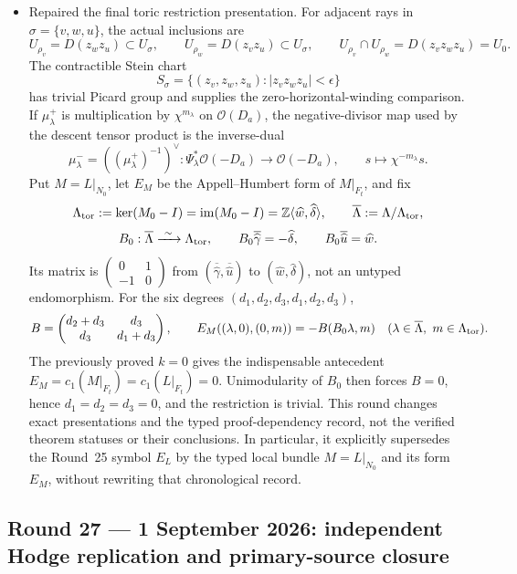 \begin{itemize}[leftmargin=1.8em]
\item Repaired the final toric restriction presentation.  For adjacent rays
in \(\sigma=\{v,w,u\}\), the actual inclusions are
\[
 U_{\rho_v}=D(z_wz_u)\subset U_\sigma,\qquad
 U_{\rho_w}=D(z_vz_u)\subset U_\sigma,\qquad
 U_{\rho_v}\cap U_{\rho_w}=D(z_vz_wz_u)=U_0.
\]
The contractible Stein chart
\[
 S_\sigma=\{(z_v,z_w,z_u):|z_vz_wz_u|<\epsilon\}
\]
has trivial Picard group and supplies the zero-horizontal-winding comparison.
If \(\mu_\lambda^+\) is multiplication by \(\chi^{m_\lambda}\) on
\(\mathcal O(D_a)\), the negative-divisor map used by the descent tensor
product is the inverse-dual
\[
 \mu_\lambda^-=((\mu_\lambda^+)^{-1})^\vee:
 \Psi_\lambda^*\mathcal O(-D_a)\longrightarrow\mathcal O(-D_a),\qquad
 s\longmapsto\chi^{-m_\lambda}s.
\]
Put \(M=L|_{N_0}\), let \(E_M\) be the Appell--Humbert form of \(M|_{F_t}\),
and fix
\[
 \Lambda_{\rm tor}:=\ker(M_0-I)=\operatorname{im}(M_0-I)
 =\mathbb Z\langle\widehat w,\widehat\delta\rangle,\qquad
 \overline\Lambda:=\Lambda/\Lambda_{\rm tor},
\]
\[
 B_0:\overline\Lambda\xrightarrow{\ \sim\ }\Lambda_{\rm tor},\qquad
 B_0\overline{\widehat\gamma}=-\widehat\delta,\qquad
 B_0\overline{\widehat u}=\widehat w.
\]
Its matrix is
\(\left(\begin{smallmatrix}0&1\\-1&0\end{smallmatrix}\right)\)
from \((\overline{\widehat\gamma},\overline{\widehat u})\) to
\((\widehat w,\widehat\delta)\), not an untyped endomorphism.
For the six degrees
\((d_1,d_2,d_3,d_1,d_2,d_3)\),
\[
 B=\begin{pmatrix}d_2+d_3&d_3\\d_3&d_1+d_3\end{pmatrix},\qquad
 E_M((\lambda,0),(0,m))=-B(B_0\lambda,m)
 \quad(\lambda\in\overline\Lambda,\ m\in\Lambda_{\rm tor}).
\]
The previously proved \(k=0\) gives the indispensable antecedent
\(E_M=c_1(M|_{F_t})=c_1(L|_{F_t})=0\).  Unimodularity of \(B_0\) then
forces \(B=0\), hence
\(d_1=d_2=d_3=0\), and the restriction is trivial.  This round changes
exact presentations and the typed proof-dependency record, not the verified theorem statuses
or their conclusions.  In particular, it explicitly supersedes the
Round~25 symbol \(E_L\) by the typed local bundle \(M=L|_{N_0}\) and its
form \(E_M\), without rewriting that chronological record.
\end{itemize}

\subsection*{Round 27 --- 1 September 2026: independent Hodge replication and primary-source closure}

